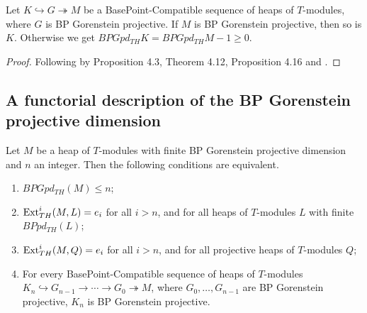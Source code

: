 \documentclass[11pt, twoside]{article}
\begin{document}
\begin{proposition}
Let $ K \hookrightarrow G \twoheadrightarrow M $ be a BasePoint-Compatible sequence of heaps of $T$-modules, where $G$ is BP Gorenstein projective. If $M$ is BP Gorenstein projective, then so is $K$. Otherwise we get $BPGpd_{TH} K = BPGpd_{TH} M - 1 \geq 0$.
\end{proposition}
\begin{proof}
Following by Proposition 4.3, Theorem 4.12, Proposition 4.16 and \cite[Corollary 2.18]{rb}.
\end{proof}
\subsection {A functorial description of the BP Gorenstein projective dimension}
\begin{theorem}\label{th4}
Let $M$ be a heap of $T$-modules with finite BP Gorenstein projective dimension and $n$ an integer. Then the following conditions are equivalent.
\begin{enumerate}
    \item[\rm(i)] $BPGpd_{TH}(M)\leq n $;
    \item[\rm(ii)] ${\rm Ext}_{TH}^{i}(M, L) = e_i$ for all $i > n$, and for all heaps of $T$-modules $L$ with finite $BPpd_{TH}(L)$;
    \item[\rm(iii)] ${\rm Ext}_{TH}^{i}(M, Q) = e_i$ for all $i > n$, and for all projective heaps of $T$-modules $Q$;
    \item[\rm(iv)] For every BasePoint-Compatible sequence of heaps of $T$-modules $K_{n} \hookrightarrow G_{n-1} \to \cdots \to G_{0} \twoheadrightarrow M$, where $G_{0}, \dots, G_{n-1}$ are BP Gorenstein projective, $K_{n}$ is BP Gorenstein projective.
\end{enumerate}
\end{theorem}
\end{document}
